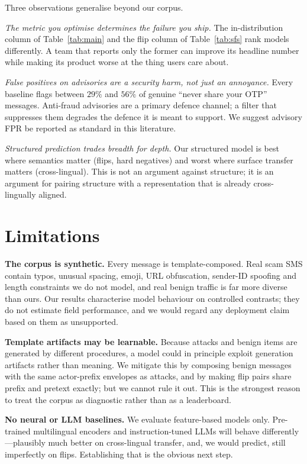 \documentclass[11pt,a4paper]{article}
\begin{document}
Three observations generalise beyond our corpus.

\emph{The metric you optimise determines the failure you ship.} The
in-distribution column of Table~\ref{tab:main} and the flip column of
Table~\ref{tab:sfs} rank models differently. A team that reports only the former
can improve its headline number while making its product worse at the thing
users care about.

\emph{False positives on advisories are a security harm, not just an annoyance.}
Every baseline flags between $29\%$ and $56\%$ of genuine ``never share your
OTP'' messages. Anti-fraud advisories are a primary defence channel; a filter
that suppresses them degrades the defence it is meant to support. We suggest
advisory FPR be reported as standard in this literature.

\emph{Structured prediction trades breadth for depth.} Our structured model is
best where semantics matter (flips, hard negatives) and worst where surface
transfer matters (cross-lingual). This is not an argument against structure; it
is an argument for pairing structure with a representation that is already
cross-lingually aligned.

\section{Limitations}
\label{sec:limits}

\textbf{The corpus is synthetic.} Every message is template-composed. Real scam
SMS contain typos, unusual spacing, emoji, URL obfuscation, sender-ID spoofing
and length constraints we do not model, and real benign traffic is far more
diverse than ours. Our results characterise model behaviour on controlled
contrasts; they do not estimate field performance, and we would regard any
deployment claim based on them as unsupported.

\textbf{Template artifacts may be learnable.} Because attacks and benign items
are generated by different procedures, a model could in principle exploit
generation artifacts rather than meaning. We mitigate this by composing benign
messages with the same actor-prefix envelopes as attacks, and by making flip
pairs share prefix and pretext exactly; but we cannot rule it out. This is the
strongest reason to treat the corpus as diagnostic rather than as a leaderboard.

\textbf{No neural or LLM baselines.} We evaluate feature-based models only.
Pre-trained multilingual encoders and instruction-tuned LLMs will behave
differently---plausibly much better on cross-lingual transfer, and, we would
predict, still imperfectly on flips. Establishing that is the obvious next step.
\end{document}
